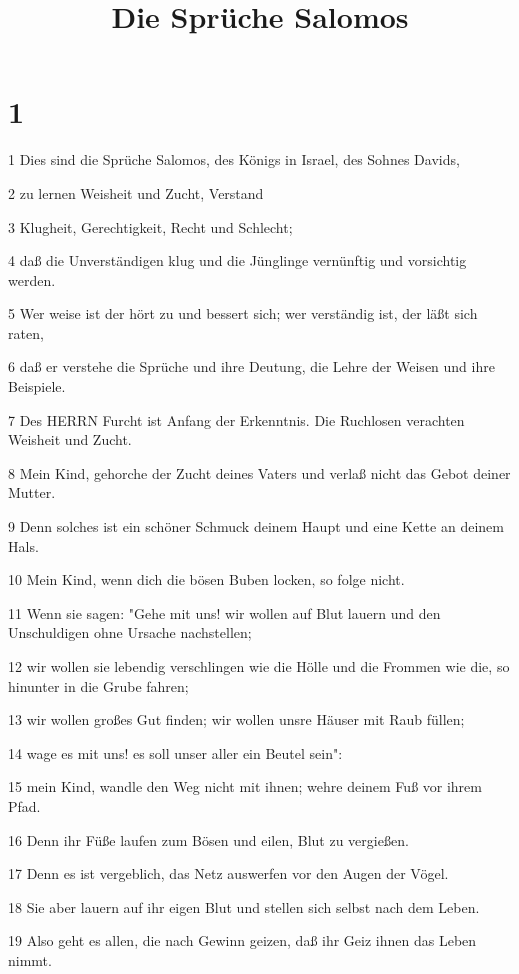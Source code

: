 

\title{Die Sprüche Salomos}


\chapter{1}

\par 1 Dies sind die Sprüche Salomos, des Königs in Israel, des Sohnes Davids,
\par 2 zu lernen Weisheit und Zucht, Verstand
\par 3 Klugheit, Gerechtigkeit, Recht und Schlecht;
\par 4 daß die Unverständigen klug und die Jünglinge vernünftig und vorsichtig werden.
\par 5 Wer weise ist der hört zu und bessert sich; wer verständig ist, der läßt sich raten,
\par 6 daß er verstehe die Sprüche und ihre Deutung, die Lehre der Weisen und ihre Beispiele.
\par 7 Des HERRN Furcht ist Anfang der Erkenntnis. Die Ruchlosen verachten Weisheit und Zucht.
\par 8 Mein Kind, gehorche der Zucht deines Vaters und verlaß nicht das Gebot deiner Mutter.
\par 9 Denn solches ist ein schöner Schmuck deinem Haupt und eine Kette an deinem Hals.
\par 10 Mein Kind, wenn dich die bösen Buben locken, so folge nicht.
\par 11 Wenn sie sagen: "Gehe mit uns! wir wollen auf Blut lauern und den Unschuldigen ohne Ursache nachstellen;
\par 12 wir wollen sie lebendig verschlingen wie die Hölle und die Frommen wie die, so hinunter in die Grube fahren;
\par 13 wir wollen großes Gut finden; wir wollen unsre Häuser mit Raub füllen;
\par 14 wage es mit uns! es soll unser aller ein Beutel sein":
\par 15 mein Kind, wandle den Weg nicht mit ihnen; wehre deinem Fuß vor ihrem Pfad.
\par 16 Denn ihr Füße laufen zum Bösen und eilen, Blut zu vergießen.
\par 17 Denn es ist vergeblich, das Netz auswerfen vor den Augen der Vögel.
\par 18 Sie aber lauern auf ihr eigen Blut und stellen sich selbst nach dem Leben.
\par 19 Also geht es allen, die nach Gewinn geizen, daß ihr Geiz ihnen das Leben nimmt.

